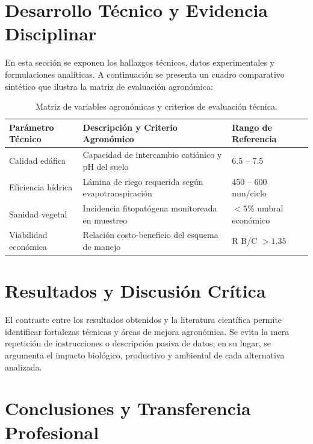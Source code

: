 \documentclass[
	spanish,
	letterpaper,
	oneside
]{article}
\begin{document}
\section{Desarrollo Técnico y Evidencia Disciplinar}
\label{sec:desarrollo}

En esta sección se exponen los hallazgos técnicos, datos experimentales y formulaciones analíticas. A continuación se presenta un cuadro comparativo sintético que ilustra la matriz de evaluación agronómica:

\begin{table}[!htb]
	\centering
	\caption{Matriz de variables agronómicas y criterios de evaluación técnica.}
	\label{tab:variables-agronomicas}
	\begin{AulatexTable}[\linewidth]
	\begin{tabularx}{\linewidth}{lZl}
		\toprule
		\textbf{Parámetro Técnico} & \textbf{Descripción y Criterio Agronómico} & \textbf{Rango de Referencia} \\
		\midrule
		Calidad edáfica & Capacidad de intercambio catiónico y pH del suelo & 6.5 -- 7.5 \\
		Eficiencia hídrica & Lámina de riego requerida según evapotranspiración & 450 -- 600 mm/ciclo \\
		Sanidad vegetal & Incidencia fitopatógena monitoreada en muestreo & $< 5\%$ umbral económico \\
		Viabilidad económica & Relación costo-beneficio del esquema de manejo & R B/C $> 1.35$ \\
		\bottomrule
	\end{tabularx}
	\end{AulatexTable}
\end{table}
\FloatBarrier

\section{Resultados y Discusión Crítica}
\label{sec:discusion}

El contraste entre los resultados obtenidos y la literatura científica permite identificar fortalezas técnicas y áreas de mejora agronómica. Se evita la mera repetición de instrucciones o descripción pasiva de datos; en su lugar, se argumenta el impacto biológico, productivo y ambiental de cada alternativa analizada.

\clearpage
\section{Conclusiones y Transferencia Profesional}
\label{sec:conclusiones}
\end{document}
